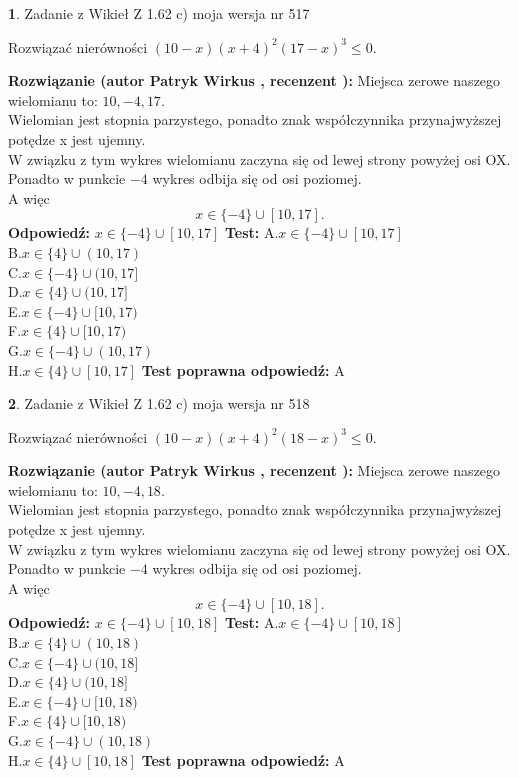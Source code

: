 \documentclass[12pt, a4paper]{article}
\theoremstyle{definition} %
\newtheorem{zad}{}
\newcommand{\zadStart}[1]{\begin{zad}#1\newline}
\newcommand{\zadStop}{\end{zad}}
\newcommand{\rozwStart}[2]{\noindent \textbf{Rozwiązanie (autor #1 , recenzent #2): }\newline}
\newcommand{\rozwStop}{\newline}
\newcommand{\odpStart}{\noindent \textbf{Odpowiedź:}\newline}
\newcommand{\odpStop}{\newline}
\newcommand{\testStart}{\noindent \textbf{Test:}\newline}
\newcommand{\testStop}{\newline}
\newcommand{\kluczStart}{\noindent \textbf{Test poprawna odpowiedź:}\newline}
\newcommand{\kluczStop}{\newline}
\begin{document}
\zadStart{Zadanie z Wikieł Z 1.62 c) moja wersja nr 517}

Rozwiązać nierówności $(10-x)(x+4)^{2}(17-x)^{3}\le0$.
\zadStop
\rozwStart{Patryk Wirkus}{}
Miejsca zerowe naszego wielomianu to: $10, -4, 17$.\\
Wielomian jest stopnia parzystego, ponadto znak współczynnika przy\linebreak najwyższej potędze x jest ujemny.\\ W związku z tym wykres wielomianu zaczyna się od lewej strony powyżej osi OX.\\
Ponadto w punkcie $-4$ wykres odbija się od osi poziomej.\\
A więc $$x \in \{-4\} \cup [10,17].$$
\rozwStop
\odpStart
$x \in \{-4\} \cup [10,17]$
\odpStop
\testStart
A.$x \in \{-4\} \cup [10,17]$\\
B.$x \in \{4\} \cup (10,17)$\\
C.$x \in \{-4\} \cup (10,17]$\\
D.$x \in \{4\} \cup (10,17]$\\
E.$x \in \{-4\} \cup [10,17)$\\
F.$x \in \{4\} \cup [10,17)$\\
G.$x \in \{-4\} \cup (10,17)$\\
H.$x \in \{4\} \cup [10,17]$
\testStop
\kluczStart
A
\kluczStop



\zadStart{Zadanie z Wikieł Z 1.62 c) moja wersja nr 518}

Rozwiązać nierówności $(10-x)(x+4)^{2}(18-x)^{3}\le0$.
\zadStop
\rozwStart{Patryk Wirkus}{}
Miejsca zerowe naszego wielomianu to: $10, -4, 18$.\\
Wielomian jest stopnia parzystego, ponadto znak współczynnika przy\linebreak najwyższej potędze x jest ujemny.\\ W związku z tym wykres wielomianu zaczyna się od lewej strony powyżej osi OX.\\
Ponadto w punkcie $-4$ wykres odbija się od osi poziomej.\\
A więc $$x \in \{-4\} \cup [10,18].$$
\rozwStop
\odpStart
$x \in \{-4\} \cup [10,18]$
\odpStop
\testStart
A.$x \in \{-4\} \cup [10,18]$\\
B.$x \in \{4\} \cup (10,18)$\\
C.$x \in \{-4\} \cup (10,18]$\\
D.$x \in \{4\} \cup (10,18]$\\
E.$x \in \{-4\} \cup [10,18)$\\
F.$x \in \{4\} \cup [10,18)$\\
G.$x \in \{-4\} \cup (10,18)$\\
H.$x \in \{4\} \cup [10,18]$
\testStop
\kluczStart
A
\kluczStop
\end{document}
